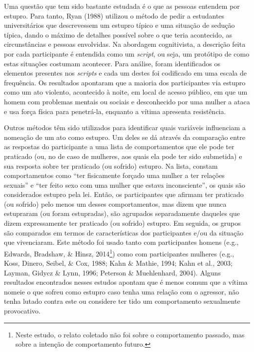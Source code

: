Uma questão que tem sido bastante estudada é o que as pessoas entendem por estupro. Para tanto, Ryan (1988) utilizou o método de pedir a estudantes universitários que descrevessem um estupro típico e uma situação de sedução típica, dando o máximo de detalhes possível sobre o que teria acontecido, as circunstâncias e pessoas envolvidas. Na abordagem cognitivista, a descrição feita por cada participante é entendida como um \textit{script}, ou seja, um protótipo de como estas situações costumam acontecer. Para análise, foram identificados os elementos presentes nos \textit{scripts} e cada um destes foi codificado em uma escala de frequência. Os resultados apontaram que a maioria dos participantes via estupro como um ato violento, acontecido à noite, em local de acesso público, em que um homem com problemas mentais ou sociais e desconhecido por uma mulher a ataca e usa força física para penetrá-la, enquanto a vítima apresenta resistência.

Outros métodos têm sido utilizados para identificar quais variáveis influenciam a nomeação de um ato como estupro. Um deles se dá através da comparação entre as respostas do participante a uma lista de comportamentos que ele pode ter praticado (ou, no de caso de mulheres, aos quais ela pode ter sido submetida) e sua resposta sobre ter praticado (ou sofrido) estupro. Na lista, constam comportamentos como ``ter fisicamente forçado uma mulher a ter relações sexuais'' e ``ter feito sexo com uma mulher que estava inconsciente'', os quais são considerados estupro pela lei. Então, os participantes que afirmam ter praticado (ou sofrido) pelo menos um desses comportamentos, mas dizem que nunca estupraram (ou foram estupradas), são agrupados separadamente daqueles que dizem expressamente ter praticado (ou sofrido) estupro. Em seguida, os grupos são comparados em termos de características dos participantes e/ou da situação que vivenciaram. Este método foi usado tanto com participantes homens (e.g., Edwards, Bradshaw, \& Hinsz, 2014\footnote{Neste estudo, o relato coletado não foi sobre o comportamento passado, mas sobre a intenção de comportamento futuro.}) como com participantes mulheres (e.g., Koss, Dinero, Seibel, \& Cox, 1988; Kahn \& Mathie, 1994; Kahn et al., 2003; Layman, Gidycz \& Lynn, 1996; Peterson \& Muehlenhard, 2004). Alguns resultados encontrados nesses estudos apontam que é menos comum que a vítima nomeie o que sofreu como estupro caso tenha uma relação com o agressor, não tenha lutado contra este ou considere ter tido um comportamento sexualmente provocativo.

